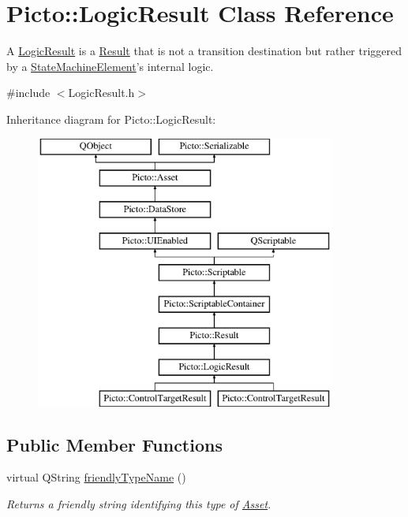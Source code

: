\hypertarget{class_picto_1_1_logic_result}{\section{Picto\-:\-:Logic\-Result Class Reference}
\label{class_picto_1_1_logic_result}
}


A \hyperlink{class_picto_1_1_logic_result}{Logic\-Result} is a \hyperlink{class_picto_1_1_result}{Result} that is not a transition destination but rather triggered by a \hyperlink{class_picto_1_1_state_machine_element}{State\-Machine\-Element}'s internal logic.  




{\ttfamily \#include $<$Logic\-Result.\-h$>$}

Inheritance diagram for Picto\-:\-:Logic\-Result\-:\begin{figure}[H]
\begin{center}
\leavevmode
\includegraphics[height=9.000000cm]{class_picto_1_1_logic_result}
\end{center}
\end{figure}
\subsection*{Public Member Functions}
\begin{DoxyCompactItemize}
\item 
virtual Q\-String \hyperlink{class_picto_1_1_logic_result_ac50cf46d11bb005735d12f5e230fbf64}{friendly\-Type\-Name} ()
\begin{DoxyCompactList}\small\item\em Returns a friendly string identifying this type of \hyperlink{class_picto_1_1_asset}{Asset}. \end{DoxyCompactList}\end{DoxyCompactItemize}
